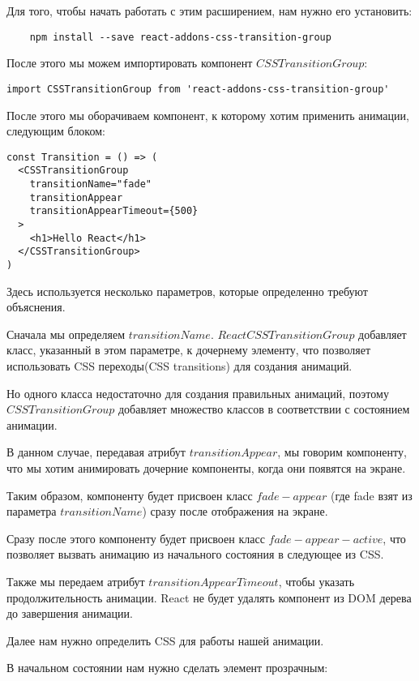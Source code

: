 Для того, чтобы начать работать с этим расширением, нам нужно его установить:

\begin{lstlisting}
	npm install --save react-addons-css-transition-group
\end{lstlisting}

После этого мы можем импортировать компонент $CSSTransitionGroup$:

\begin{lstlisting}
import CSSTransitionGroup from 'react-addons-css-transition-group'
\end{lstlisting}

После этого мы оборачиваем компонент, к которому хотим применить анимации, следующим блоком:

\begin{lstlisting}
const Transition = () => (
  <CSSTransitionGroup
    transitionName="fade"
    transitionAppear
    transitionAppearTimeout={500}
  >
    <h1>Hello React</h1>
  </CSSTransitionGroup>
)
\end{lstlisting}

Здесь используется несколько параметров, которые определенно требуют объяснения.

Сначала мы определяем $transitionName$. $ReactCSSTransitionGroup$ добавляет класс, указанный в этом параметре, к дочернему элементу, что позволяет использовать CSS переходы(CSS transitions) для создания анимаций.

Но одного класса недостаточно для создания правильных анимаций, поэтому $CSSTransitionGroup$ добавляет множество классов в соответствии с состоянием анимации.

В данном случае, передавая атрибут $transitionAppear$, мы говорим компоненту, что мы хотим анимировать дочерние компоненты, когда они появятся на экране.

Таким образом, компоненту будет присвоен класс $fade-appear$ (где fade взят из параметра $transitionName$) сразу после отображения на экране.

Сразу после этого компоненту будет присвоен класс $fade-appear-active$, что позволяет вызвать анимацию из начального состояния в следующее из CSS.

Также мы передаем атрибут $transitionAppearTimeout$, чтобы указать продолжительность анимации. React не будет удалять компонент из DOM дерева до завершения анимации.

Далее нам нужно определить CSS для работы нашей анимации.

В начальном состоянии нам нужно сделать элемент прозрачным:

